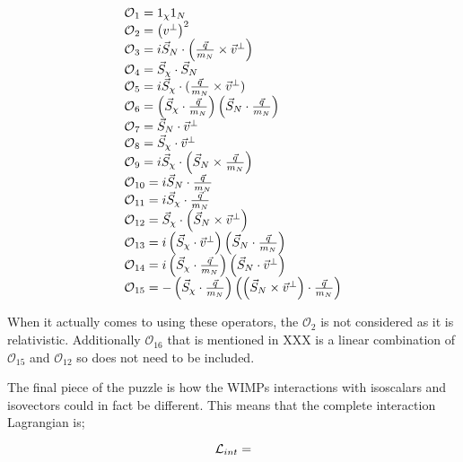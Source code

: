 \begin{equation}
\begin{array}{lcl}
\operatorname{\mathcal{O}}_{1}=1_{\chi}1_N \\ 
\operatorname{\mathcal{O}}_{2}=\left(v^{\perp}\right)^{2} \\
\operatorname{\mathcal{O}}_{3}=i \vec{S}_{N} \cdot\left(\frac{\vec{q}}{m_N} \times \vec{v}^{\perp}\right) \\ 
\operatorname{\mathcal{O}}_{4}=\vec{S}_{\chi} \cdot \vec{S}_{N} \\ 
\operatorname{\mathcal{O}}_{5}=i \vec{S}_{\chi} \cdot(\frac{\vec{q}}{m_N} \times \vec{v}^{\perp}) \\ 
\operatorname{\mathcal{O}}_{6}=\left(\vec{S}_{\chi} \cdot \frac{\vec{q}}{m_N}\right)\left(\vec{S}_{N} \cdot \frac{\vec{q}}{m_N}\right) \\
\operatorname{\mathcal{O}}_{7}=\vec{S}_{N} \cdot \vec{v}^{\perp} \\
\operatorname{\mathcal{O}}_{8}=\vec{S}_{\chi} \cdot \vec{v}^{\perp} \\ 
\operatorname{\mathcal{O}}_{9}=i \vec{S}_{\chi} \cdot\left(\vec{S}_{N} \times \frac{\vec{q}}{m_N}\right) \\
\operatorname{\mathcal{O}}_{10}=i \vec{S}_{N} \cdot \frac{\vec{q}}{m_N} \\ 
\operatorname{\mathcal{O}}_{11}=i \vec{S}_{\chi} \cdot \frac{\vec{q}}{m_N} \\
\operatorname{\mathcal{O}}_{12} =\vec{S}_{\chi} \cdot\left(\vec{S}_{N} \times \vec{v}^{\perp}\right) \\
\operatorname{\mathcal{O}}_{13} =i\left(\vec{S}_{\chi} \cdot \vec{v}^{\perp}\right)\left(\vec{S}_{N} \cdot \frac{\vec{q}}{m_N}\right) \\ 
\operatorname{\mathcal{O}}_{14} =i\left(\vec{S}_{\chi} \cdot \frac{\vec{q}}{m_N}\right)\left(\vec{S}_{N} \cdot \vec{v}^{\perp}\right) \\ 
\operatorname{\mathcal{O}}_{15} =-\left(\vec{S}_{\chi} \cdot \frac{\vec{q}}{m_N}\right)\left(\left(\vec{S}_{N} \times \vec{v}^{\perp}\right) \cdot \frac{\vec{q}}{m_N}\right)
\end{array}
\label{eq:EFT_Operators}
\end{equation}

\par
When it actually comes to using these operators, the $\mathcal{O}_{2}$ is not considered as it is relativistic. 
Additionally $\mathcal{O}_{16}$ that is mentioned in XXX is a linear combination of $\mathcal{O}_{15}$ and $\mathcal{O}_{12}$ so does not need to be included.

\par
The final piece of the puzzle is how the WIMPs interactions with isoscalars and isovectors could in fact be different.
This means that the complete interaction Lagrangian is;

\begin{equation}
    \operatorname{\mathcal{L}}_{int} = 
    \label{eq:HENR_Interaction_Lagrangian}
\end{equation}

